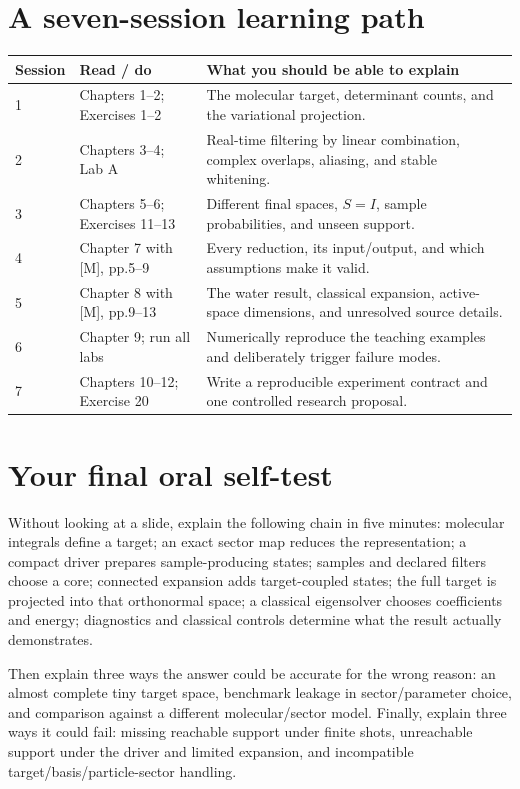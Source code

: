 \documentclass[11pt,a4paper,oneside]{report}
\begin{document}
\section{A seven-session learning path}
\begin{longtable}{@{}p{15mm}p{61mm}p{74mm}@{}}
\toprule Session & Read / do & What you should be able to explain\\\midrule\endhead
1 & Chapters 1--2; Exercises 1--2 & The molecular target, determinant counts, and the variational projection.\\
2 & Chapters 3--4; Lab A & Real-time filtering by linear combination, complex overlaps, aliasing, and stable whitening.\\
3 & Chapters 5--6; Exercises 11--13 & Different final spaces, $S=I$, sample probabilities, and unseen support.\\
4 & Chapter 7 with [M], pp.5--9 & Every reduction, its input/output, and which assumptions make it valid.\\
5 & Chapter 8 with [M], pp.9--13 & The water result, classical expansion, active-space dimensions, and unresolved source details.\\
6 & Chapter 9; run all labs & Numerically reproduce the teaching examples and deliberately trigger failure modes.\\
7 & Chapters 10--12; Exercise 20 & Write a reproducible experiment contract and one controlled research proposal.\\\bottomrule
\end{longtable}

\section{Your final oral self-test}
Without looking at a slide, explain the following chain in five minutes: molecular integrals define a target; an exact sector map reduces the representation; a compact driver prepares sample-producing states; samples and declared filters choose a core; connected expansion adds target-coupled states; the full target is projected into that orthonormal space; a classical eigensolver chooses coefficients and energy; diagnostics and classical controls determine what the result actually demonstrates.

Then explain three ways the answer could be accurate for the wrong reason: an almost complete tiny target space, benchmark leakage in sector/parameter choice, and comparison against a different molecular/sector model. Finally, explain three ways it could fail: missing reachable support under finite shots, unreachable support under the driver and limited expansion, and incompatible target/basis/particle-sector handling.
\end{document}
